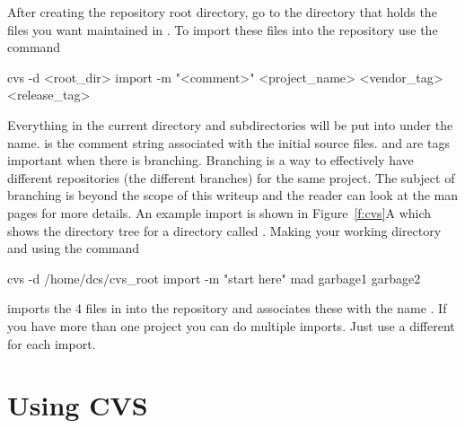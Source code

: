 After creating the repository root directory, go to the directory that
holds the files you want maintained in \cvs. To import these files
into the \cvs repository use the command
\begin{example}
  cvs -d <root_dir> import -m "<comment>" <project_name> <vendor_tag> <release_tag>
\end{example}
Everything in the current directory and subdirectories will be put
into \cvs under the  name.   is the
comment string associated with the initial source
files.  and  are tags important
when there is branching. Branching is a way to effectively have
different repositories (the different branches) for the same
project. The subject of branching is beyond the scope of this writeup
and the reader can look at the \cvs man pages for more details.  An
example import is shown in Figure~\ref{f:cvs}A which shows the
directory tree for a directory called
.  Making  your working
directory and using the command
\begin{example}
    cvs -d /home/dcs/cvs_root import -m "start here" mad garbage1 garbage2
\end{example}
imports the 4 files in  into the repository and
associates these with the name . If you have more than one
project you can do multiple imports. Just use a different
 for each import.

\section{Using CVS}
\label{s:cvs_use}

